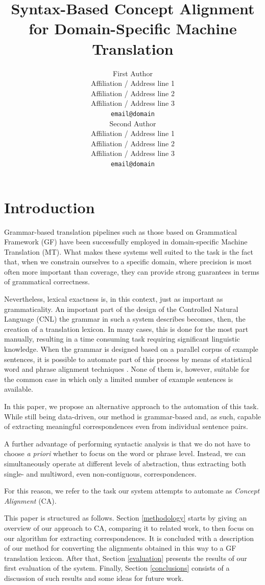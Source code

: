 \documentclass[11pt]{article}
\title{Syntax-Based Concept Alignment for Domain-Specific Machine Translation}
\author{First Author \\
  Affiliation / Address line 1 \\
  Affiliation / Address line 2 \\
  Affiliation / Address line 3 \\
  \texttt{email@domain} \\\And
  Second Author \\
  Affiliation / Address line 1 \\
  Affiliation / Address line 2 \\
  Affiliation / Address line 3 \\
  \texttt{email@domain} \\}
\begin{document}
\maketitle
\begin{abstract}
\end{abstract}

\section{Introduction}
Grammar-based translation pipelines such as those based on Grammatical Framework (GF) \cite{TODO:} have been successfully employed in domain-specific Machine Translation (MT). 
What makes these systems well suited to the task is the fact that, when we constrain ourselves to a specific domain, where precision is most often more important than coverage, they can provide strong guarantees in terms of grammatical correctness. 

Nevertheless, lexical exactness is, in this context, just as important as grammaticality. 
An important part of the design of the Controlled Natural Language (CNL) the grammar in such a system describes becomes, then, the creation of a translation lexicon. 
In many cases, this is done for the most part manually, resulting in a time consuming task requiring significant linguistic knowledge. 
When the grammar is designed based on a parallel corpus of example sentences, it is possible to automate part of this process by means of statistical word and phrase alignment techniques \cite{TODO: a lot}. 
None of them is, however, suitable for the common case in which only a limited number of example sentences is available.

In this paper, we propose an alternative approach to the automation of this task. 
While still being data-driven, our method is grammar-based and, as such, capable of extracting meaningful correspondences even from individual sentence pairs. 

A further advantage of performing syntactic analysis is that we do not have to choose \textit{a priori} whether to focus on the word or phrase level. 
Instead, we can simultaneously operate at different levels of abstraction, thus extracting both single- and multiword, even non-contiguous, correspondences. 

For this reason, we refer to the task our system attempts to automate as \textit{Concept Alignment} (CA). 

This paper is structured as follows. 
Section \ref{methodology} starts by giving an overview of our approach to CA, comparing it to related work, to then focus on our algorithm for extracting correspondences.
It is concluded with a description of our method for converting the alignments obtained in this way to a GF translation lexicon.
After that, Section \ref{evaluation} presents the results of our first evaluation of the system.
Finally, Section \ref{conclusions} consists of a discussion of such results and some ideas for future work. 
\end{document}
